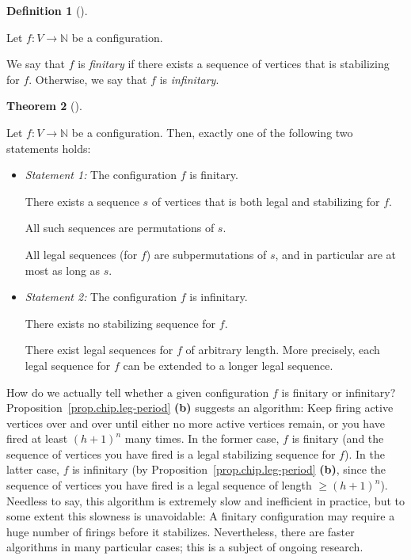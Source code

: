 \documentclass[numbers=enddot,12pt,final,onecolumn,notitlepage]{scrartcl}%
\theoremstyle{definition}
\newtheorem{theo}{Theorem}[section]
\newenvironment{theorem}[1][]
{\begin{theo}[#1]\begin{leftbar}}
{\end{leftbar}\end{theo}}
\newtheorem{defi}[theo]{Definition}
\newenvironment{definition}[1][]
{\begin{defi}[#1]\begin{leftbar}}
{\end{leftbar}\end{defi}}
\newcommand{\NN}{\mathbb{N}}
\newcommand{\tup}[1]{\left( #1 \right)}
\begin{document}
\begin{definition}
Let $f : V \to \NN$ be a configuration.

We say that $f$ is \textit{finitary} if there
exists a sequence of vertices that is stabilizing for $f$.
Otherwise, we say that $f$ is \textit{infinitary}.
\end{definition}

\begin{theorem} \label{thm.chip.dichotomy}
Let $f : V \to \NN$ be a configuration.
Then, exactly one of the following two statements holds:

\begin{itemize}
\item \textit{Statement 1:}
      The configuration $f$ is finitary. \par
      There exists a sequence $s$ of vertices that is both
      legal and stabilizing for $f$. \par
      All such sequences are permutations of $s$.
      \par
      All legal sequences (for $f$) are subpermutations
      of $s$, and in particular are at most as long as $s$.

\item \textit{Statement 2:}
      The configuration $f$ is infinitary. \par
      There exists no stabilizing sequence for $f$. \par
      There exist legal sequences for $f$ of arbitrary length.
      More precisely, each legal sequence for $f$ can be
      extended to a longer legal sequence.
\end{itemize}
\end{theorem}

How do we actually tell whether a given configuration $f$
is finitary or infinitary?
Proposition~\ref{prop.chip.leg-period} \textbf{(b)} suggests
an algorithm:
Keep firing active vertices over and over until either no
more active vertices remain, or you have fired at least
$\tup{h+1}^n$ many times.
In the former case, $f$ is finitary (and the sequence
of vertices you have fired is a legal stabilizing sequence
for $f$).
In the latter case, $f$ is infinitary (by
Proposition~\ref{prop.chip.leg-period} \textbf{(b)},
since the sequence of vertices you have fired is a
legal sequence of length $\geq \tup{h+1}^n$).
Needless to say, this algorithm is extremely slow and
inefficient in practice, but to some extent this slowness
is unavoidable:
A finitary configuration may require a huge number of firings
before it stabilizes.
Nevertheless, there are faster algorithms in many particular
cases; this is a subject of ongoing research.
\end{document}
